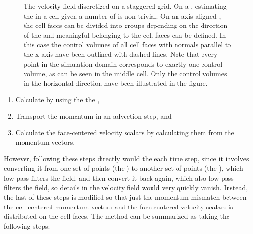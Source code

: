 \begin{figure}
{
    }
    \caption{The velocity field discretized on a staggered grid.  On a , estimating the  in a cell given a number of   is non-trivial.  On an axis-aligned , the cell faces can be divided into groups depending on the direction of the  and meaningful  belonging to the cell faces can be defined. In this case the control volumes of all cell faces with normals parallel to the x-axis have been outlined with dashed lines. Note that every point in the simulation domain corresponds to exactly one control volume, as can be seen in the middle cell. Only the control volumes in the horizontal direction have been illustrated in the figure.}
    \label{fig:velocity_advection}
\end{figure}

\begin{enumerate}
    \item Calculate   by using the the  ,
    \item Transport the momentum in an advection step, and
    \item Calculate the face-centered velocity scalars by calculating them from the momentum vectors.
\end{enumerate}

However, following these steps directly would  the  each time step, since it involves converting it from one set of points (the ) to another set of points (the ), which low-pass filters the field, and then convert it back again, which also low-pass filters the field, so details in the velocity field would very quickly vanish. Instead, the last of these steps is modified so that just the momentum mismatch between the cell-centered momentum vectors and the face-centered velocity scalars is distributed on the cell faces. The method can be summarized as taking the following steps:

